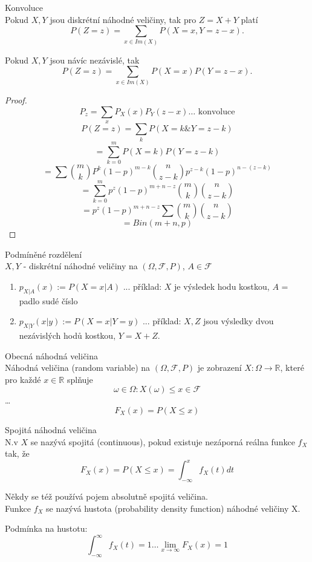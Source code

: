 \documentclass[../main.tex]{subfiles}
\begin{document}
\begin{theorem}
    Konvoluce\\

    Pokud $X,Y$ jsou diskrétní náhodné veličiny, tak pro $Z = X+Y$ platí
    \[P(Z=z) = \sum_{x\in Im(X)} P(X=x,Y=z-x).\]

    Pokud $X,Y$ jsou návíc nezávislé, tak 
    \[P(Z=z) = \sum_{x\in Im(X)} P(X=x)P(Y=z-x).\]
    \begin{proof}
        \[P_z = \sum_x P_X(x)P_Y(z-x) \dots \text{ konvoluce}\]
        \[P(Z=z) = \sum_k P(X=k \& Y=z-k)\]
        \[ = \sum_{k=0}^m P(X=k)P(Y=z-k)\]
        \[ = \sum \binom{m}{k}P^k (1-p)^{m-k} \binom{n}{z-k}p^{z-k}(1-p)^{n-(z-k)}\]
        \[ = \sum^m_{k=0} p^z(1-p)^{m+n-z}\binom{m}{k}\binom{n}{z-k}\]
        \[ = p^z(1-p)^{m+n-z} \sum \binom{m}{k} \binom{n}{z-k}\]
        \[ = Bin(m+n,p)\]
    \end{proof}
\end{theorem}

\begin{definition}
    Podmíněné rozdělení\\

    $X,Y$ - diskrétní náhodné veličiny na $(\Omega, \mathcal{F}, P)$, $A \in \mathcal{F}$
    \begin{enumerate}
        \item $p_{X|A}(x) := P(X=x|A)$ ... příklad: $X$ je výsledek hodu kostkou, $A$ = padlo sudé číslo
        \item $p_{X|Y}(x|y) := P(X=x|Y=y)$ ... příklad: $X,Z$ jsou výsledky dvou nezávislých hodů kostkou, $Y = X+Z$.
    \end{enumerate}
\end{definition}

\begin{definition}
    Obecná náhodná veličina\\

    Náhodná veličina (random variable) na $(\Omega,\mathcal{F},P)$ je zobrazení $X: \Omega \rightarrow \mathbb{R}$, které
    pro každé $x \in \mathbb{R}$ splňuje
    \[{\omega \in \Omega : X(\omega) \leq x} \in \mathcal{F}\]
    \dots
    \[F_X(x) = P(X\leq x)\]
\end{definition}

\begin{definition}
    Spojitá náhodná veličina\\

    N.v $X$ se nazývá spojitá (continuous), pokud existuje nezáporná reálna funkce $f_X$ tak, že 
    \[F_X(x) = P(X\leq x) = \int^x_{-\infty} f_X(t)dt\]

    Někdy se též používá pojem absolutně spojitá veličina.\\

    Funkce $f_X$ se nazývá hustota (probability density function) náhodné veličiny X.

    Podmínka na hustotu: 
    \[\int^\infty_{-\infty} f_X(t) =  1 \dots \lim_{x\rightarrow \infty} F_X(x) =1\]
\end{definition}
\end{document}
